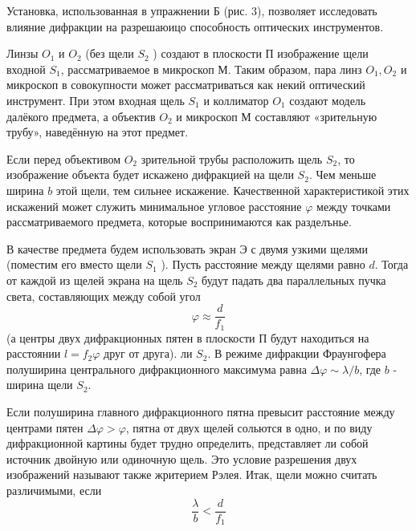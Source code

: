 \documentclass[a4paper, 12pt]{article}
\begin{document}
Установка, использованная в упражнении Б (рис. 3), позволяет исследовать влияние дифракции на разрешаюицо способность оптических инструментов.

Линзы $O_1$ и $O_2$ (без щели $S_2$ ) создают в плоскости П изображение щели входной $S_1$, рассматриваемое в микроскоп М. Таким образом, пара линз $O_1, O_2$ и микроскоп в совокупности может рассматриваться как некий оптический инструмент. При этом входная щель $S_1$ и коллиматор $O_1$ создают модель далёкого предмета, а объектив $O_2$ и микроскоп М составляют «зрительную трубу», наведённую на этот предмет.

Если перед объективом $O_2$ зрительной трубы расположить щель $S_2$, то изображение объекта будет искажено дифракцией на щели $S_2$. Чем меньше ширина $b$ этой щели, тем сильнее искажение. Качественной характеристикой этих искажений может служить минимальное угловое расстояние $\varphi$ между точками рассматриваемого предмета, которые воспринимаются как разделънье.

В качестве предмета будем использовать экран $\text{Э}$ с двумя узкими щелями (поместим его вместо щели $S_1$ ). Пусть расстояние между щелями равно $d$. Тогда от каждой из щелей экрана на щель $S_2$ будут падать два параллельных пучка света, составляющих между собой угол
\begin{equation*}
\varphi \approx \frac{d}{f_1}
\end{equation*}
(а центры двух дифракционных пятен в плоскости П будут находиться на расстоянии $l=f_2 \varphi$ друг от друга). ли $S_2$. В режиме дифракции Фраунгофера полуширина центрального дифракционного максимума равна $\Delta \varphi \sim \lambda / b$, где $b$ - ширина щели $S_2$.

Если полуширина главного дифракционного пятна превысит расстояние между центрами пятен $\Delta \varphi>\varphi$, пятна от двух щелей сольются в одно, и по виду дифракционной картины будет трудно определить, представляет ли собой источник двойную или одиночную щель. Это условие разрешения двух изображений называют также жритерием Рэлея. Итак, щели можно считать различимыми, если
\begin{equation*}
\frac{\lambda}{b}<\frac{d}{f_1}
\end{equation*}
\end{document}

